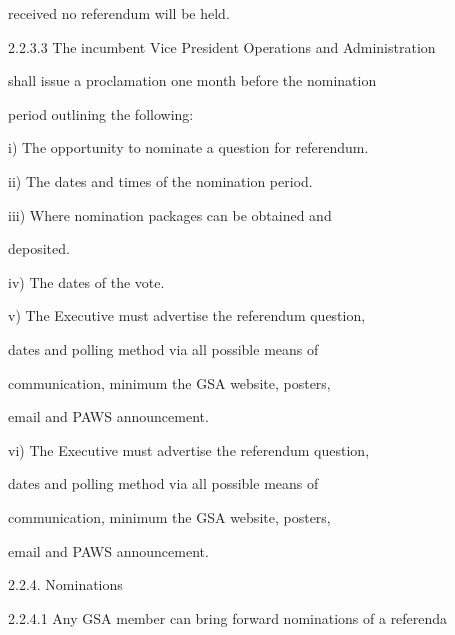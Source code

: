                received no referendum will be held.   

  

2.2.3.3        The  incumbent  Vice  President  Operations  and  Administration  

               shall  issue  a  proclamation  one  month  before  the  nomination  

               period outlining the following:   

  

                  i)       The opportunity to nominate a question for referendum.  

  

                  ii)      The dates and times of the nomination period.  

  

                  iii)     Where        nomination         packages        can    be     obtained       and  

                           deposited.  

  

                  iv)      The dates of the vote.   

           



                  v)       The  Executive  must  advertise  the  referendum  question,  

                           dates  and  polling  method  via  all  possible  means  of  

                           communication,   minimum   the   GSA   website,   posters,  

                           email and PAWS announcement.  

           



                  vi)      The  Executive  must  advertise  the  referendum  question,  

                           dates  and  polling  method  via  all  possible  means  of  

                           communication,   minimum   the   GSA   website,   posters,  

                           email and PAWS announcement.  

  

2.2.4. Nominations  

  

2.2.4.1        Any GSA member can bring forward nominations of a referenda  


